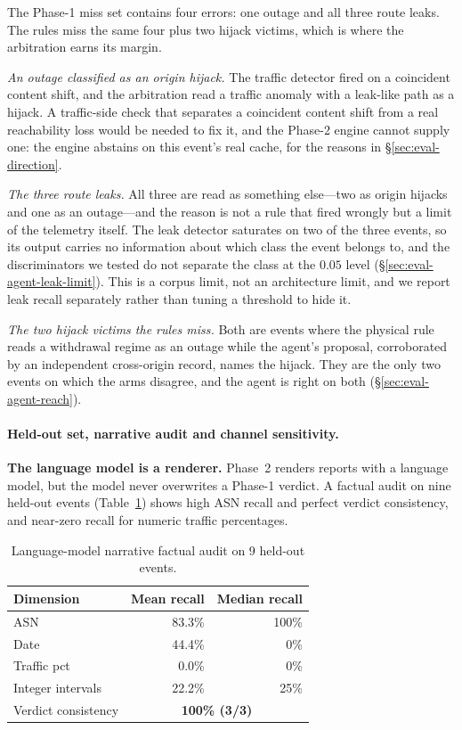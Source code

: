 The Phase-1 miss set contains four errors: one outage and all three
route leaks. The rules miss the same four plus two hijack victims, which
is where the arbitration earns its margin.

\emph{An outage classified as an origin hijack.} The traffic detector
fired on a coincident content shift, and the arbitration read a traffic
anomaly with a leak-like path as a hijack. A traffic-side check that
separates a coincident content shift from a real reachability loss would
be needed to fix it, and the Phase-2 engine cannot supply one: the engine
abstains on this event's real cache, for the reasons in
\S\ref{sec:eval-direction}.

\emph{The three route leaks.} All three are read as something else---two
as origin hijacks and one as an outage---and the reason is not a rule
that fired wrongly but a limit of the telemetry itself. The leak
detector saturates on two of the three events, so its output carries no
information about which class the event belongs to, and the discriminators
we tested do not separate the class at the $0.05$ level
(\S\ref{sec:eval-agent-leak-limit}). This is a corpus limit, not an
architecture limit, and we report leak recall separately rather than
tuning a threshold to hide it.

\emph{The two hijack victims the rules miss.} Both are events where the
physical rule reads a withdrawal regime as an outage while the agent's
proposal, corroborated by an independent cross-origin record, names the
hijack. They are the only two events on which the arms disagree, and the
agent is right on both (\S\ref{sec:eval-agent-reach}).

\paragraph{Held-out set, narrative audit and channel sensitivity.}
\label{sec:eval-audit}

\textbf{The language model is a renderer.} Phase~2 renders reports with a
language model, but the model never overwrites a Phase-1 verdict. A factual
audit on nine held-out events (Table~\ref{tab:llm-audit}) shows high ASN
recall and perfect verdict consistency, and near-zero recall for numeric
traffic percentages.

\begin{table}[t]
\centering
\caption{Language-model narrative factual audit on 9 held-out events.}
\label{tab:llm-audit}
\small
\begin{tabular}{l r r}
\hline
\textbf{Dimension} & \textbf{Mean recall} & \textbf{Median recall} \\
\hline
ASN                 & 83.3\% & 100\% \\
Date                & 44.4\% & 0\%   \\
Traffic pct         & 0.0\%  & 0\%   \\
Integer intervals   & 22.2\% & 25\%  \\
\hline
Verdict consistency & \multicolumn{2}{c}{\textbf{100\% (3/3)}} \\
\hline
\end{tabular}
\end{table}


